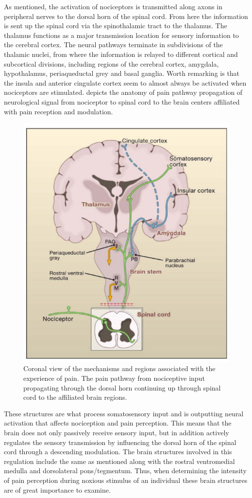 As mentioned, the activation of nociceptors is transmitted along axons in peripheral nerves to the dorsal horn of the spinal cord. From here the information is sent up the spinal cord via the spinothalamic tract to the thalamus. The thalamus functions as a major transmission location for sensory information to the cerebral cortex. The neural pathways terminate in subdivisions of the thalamic nuclei, from where the information is relayed to different cortical and subcortical divisions, including regions of the cerebral cortex, amygdala, hypothalamus, periaqueductal grey and basal ganglia. Worth remarking is that the insula and anterior cingulate cortex seem to almost always be activated when nociceptors are stimulated. \cite{Tracey2007, Davis2017}  depicts the anatomy of pain pathway propagation of neurological signal from nociceptor to spinal cord to the brain centers affiliated with pain reception and modulation.

\begin{figure}[H]                 
	\includegraphics[width=.47\textwidth]{figures/aBackground/Brain}  
	\caption{Coronal view of the mechanisms and regions associated with the experience of pain. The pain pathway from nociceptive input propagating through the dorsal horn continuing up through spinal cord to the affiliated brain regions. \cite{Basbaum2009}}
	\label{fig:back:brain} 
\end{figure}

These structures are what process somatosensory input and is outputting neural activation that affects nociception and pain perception. \cite{Garland2013} This means that the brain does not only passively receive sensory input, but in addition actively regulates the sensory transmission by influencing the dorsal horn of the spinal cord through a descending modulation. The brain structures involved in this regulation include the same as mentioned along with the rostral ventromedial medulla and dorsolateral pons/tegmentum. \cite{Tracey2007} Thus, when determining the intensity of pain perception during noxious stimulus of an individual these brain structures are of great importance to examine. 
